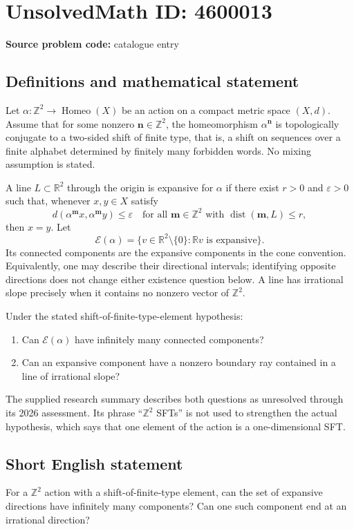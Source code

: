\documentclass[11pt]{article}
\begin{document}
\section*{UnsolvedMath ID: 4600013}
\textbf{Source problem code:} catalogue entry
\subsection{Definitions and mathematical statement}
Let $\alpha:\mathbb Z^2\to\operatorname{Homeo}(X)$ be an action on a compact metric space $(X,d)$. Assume that for some nonzero $\boldsymbol n\in\mathbb Z^2$, the homeomorphism $\alpha^{\boldsymbol n}$ is topologically conjugate to a two-sided shift of finite type, that is, a shift on sequences over a finite alphabet determined by finitely many forbidden words. No mixing assumption is stated.

A line $L\subset\mathbb R^2$ through the origin is expansive for $\alpha$ if there exist $r>0$ and $\varepsilon>0$ such that, whenever $x,y\in X$ satisfy
\[
d(\alpha^{\boldsymbol m}x,\alpha^{\boldsymbol m}y)\leq\varepsilon
\quad\text{for all }\boldsymbol m\in\mathbb Z^2
\text{ with }\operatorname{dist}(\boldsymbol m,L)\leq r,
\]
then $x=y$. Let
\[
\mathcal E(\alpha)=\{v\in\mathbb R^2\setminus\{0\}:\mathbb Rv\text{ is expansive}\}.
\]
Its connected components are the expansive components in the cone convention. Equivalently, one may describe their directional intervals; identifying opposite directions does not change either existence question below. A line has irrational slope precisely when it contains no nonzero vector of $\mathbb Z^2$.

Under the stated shift-of-finite-type-element hypothesis:
\begin{enumerate}
\item Can $\mathcal E(\alpha)$ have infinitely many connected components?
\item Can an expansive component have a nonzero boundary ray contained in a line of irrational slope?
\end{enumerate}
The supplied research summary describes both questions as unresolved through its 2026 assessment. Its phrase ``$\mathbb Z^2$ SFTs'' is not used to strengthen the actual hypothesis, which says that one element of the action is a one-dimensional SFT.
\subsection{Short English statement}
For a $\mathbb Z^2$ action with a shift-of-finite-type element, can the set of expansive directions have infinitely many components? Can one such component end at an irrational direction?
\end{document}
